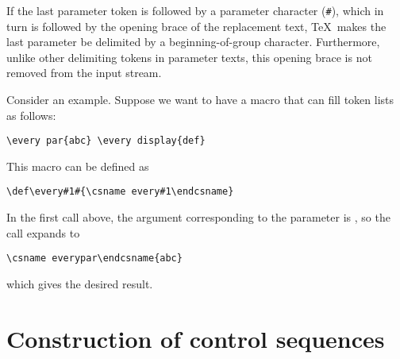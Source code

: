 \documentclass[letterpaper]{book}
\begin{document}
If the last parameter token
is followed by a parameter character (\verb>#>),
which in turn is followed by the opening brace of the
replacement text, \TeX\ makes the last parameter
be delimited by a beginning-of-group character.
Furthermore, unlike other delimiting tokens in
parameter texts, this opening brace is not
removed from the input stream.

Consider an example.
Suppose we want to have a macro
 that can fill token lists as follows:
\begin{verbatim}
\every par{abc} \every display{def}
\end{verbatim}
This macro can be defined as
\begin{verbatim}
\def\every#1#{\csname every#1\endcsname}
\end{verbatim}
In the first call above, the argument corresponding to
the parameter is , so the call 
expands to
\begin{verbatim}
\csname everypar\endcsname{abc}
\end{verbatim}
which gives the desired result.


\section{Construction of control sequences}
\label{cs:name}
\end{document}
